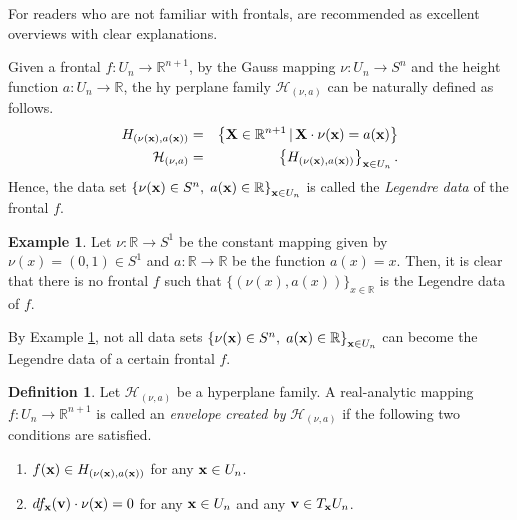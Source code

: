 \documentclass{amsart}
\theoremstyle{definition}
\newtheorem{definition}{Definition}
\theoremstyle{definition}
\newtheorem{example}{Example}
\theoremstyle{definition}
\newcommand{\ch}[1]{{\color{black} #1}}
\begin{document}
{\color{black} 
For readers who are not familiar with frontals, 
\cite{ishikawa1, ishikawa2} are recommended as excellent overviews 
with clear explanations.     
\par 
Given a frontal $f: U_n\to \mathbb{R}^{n+1}$, by 
the Gauss mapping $\nu: U_n\to S^n$ and the height function 
$a: U_n\to \mathbb{R}$, the hy\ch{p}erplane family 
$\mathcal{H}_{(\nu, a)}$ can be naturally defined as follows.   
\begin{eqnarray*} 
H_{(\nu({\bf x}), a({\bf x}))} & = & 
\left\{{\bf X}\in \mathbb{R}^{n+1}\, |\, {\bf X}\cdot 
\nu({\bf x})=a({\bf x})\right\} \\ 
\mathcal{H}_{(\nu, a)} & = & \left\{H_{(\nu({\bf x}), a({\bf x}))}\right\}_{{\bf x}\in U_n}.  
\end{eqnarray*}
Hence, the data set  
$\left\{\nu({\bf x})\in S^n, \; a({\bf x})\in \mathbb{R}\right\}_{{\bf x}\in U_n}$ 
is called the 
{\it Legendre data} of the frontal $f$.    
\begin{example}\label{example0}
Let $\nu: \mathbb{R}\to S^1$ 
be the constant mapping \ch{given by} 
$\nu({x})=(0,1)\in S^1$ and  $a: \mathbb{R}\to \mathbb{R}$ \ch{be the function} $a(x)=x$.    Then, it is clear that there \ch{is} 
no frontal $f$ such that $\{(\nu(x) , a(x))\}_{x\in \mathbb{R}}$ 
is the Legendre data of $f$.    
\end{example} 
\noindent 
By Example \ref{example0}, not all data sets   
$\left\{\nu({\bf x})\in S^n, \; a({\bf x})\in \mathbb{R}\right\}_{{\bf x}\in U_n}$ 
can become the Legendre data of a certain frontal $f$.     
\begin{definition}\label{definition1}
Let $\mathcal{H}_{\left(\nu, a\right)}$ 
be a hyperplane family.   
A real-analytic mapping ${f}: U_n\to \mathbb{R}^{n+1}$ is called 
an \textit{envelope created by} %
$\mathcal{H}_{\left(\nu, a\right)}$ 
if the following two conditions are satisfied.   
\begin{enumerate}
\item[(a)] $f({\bf x})\in 
H_{\left(\nu({\bf x}), a({\bf x})\right)}$ 
for any ${\bf x}\in U_n$.  
\item[(b)] $d{f}_{\bf x}({\bf v})\cdot \nu({\bf x})=0$ 
for any ${\bf x}\in U_n$ and 
any ${\bf v}\in T_{\bf x} U_n$.    
\end{enumerate}
\end{definition}
\noindent 
}
\end{document}
